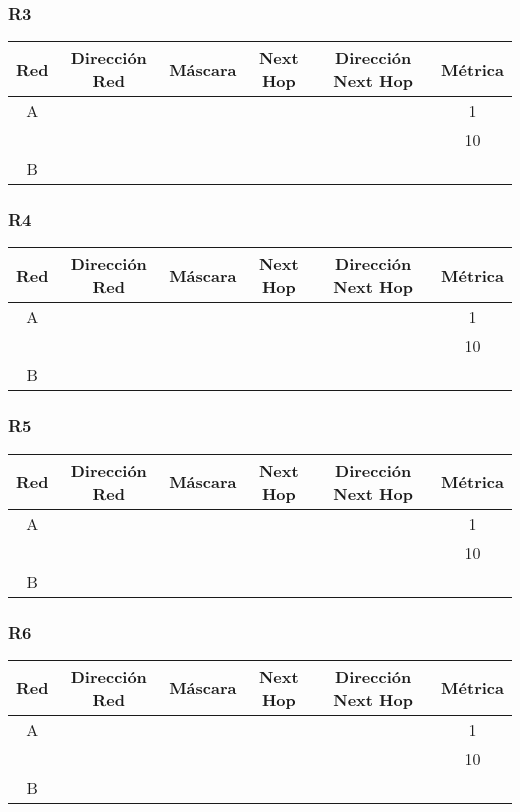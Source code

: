 \documentclass[12pt, a4paper, spanish]{article}
\begin{document}
\subsubsection{R3}
\begin{center}
\begin{tabular}{|c|c|c|c|c|c|}
	\hline
	Red & Dirección Red & Máscara & Next Hop & Dirección Next Hop & Métrica \\
	\hline
	\hline
	A &  &  &  &  & 1\\
 	  &  &  &  &  & 10 \\
	\hline	
	B & & & & &\\
	\hline
\end{tabular}
\end{center}

\subsubsection{R4}
\begin{center}
\begin{tabular}{|c|c|c|c|c|c|}
	\hline
	Red & Dirección Red & Máscara & Next Hop & Dirección Next Hop & Métrica \\
	\hline
	\hline
	A &  &  &  &  & 1\\
 	  &  &  &  &  & 10 \\
	\hline	
	B & & & & &\\
	\hline
\end{tabular}
\end{center}

\subsubsection{R5}
\begin{center}
\begin{tabular}{|c|c|c|c|c|c|}
	\hline
	Red & Dirección Red & Máscara & Next Hop & Dirección Next Hop & Métrica \\
	\hline
	\hline
	A &  &  &  &  & 1\\
 	  &  &  &  &  & 10 \\
	\hline	
	B & & & & &\\
	\hline
\end{tabular}
\end{center}

\subsubsection{R6}
\begin{center}
\begin{tabular}{|c|c|c|c|c|c|}
	\hline
	Red & Dirección Red & Máscara & Next Hop & Dirección Next Hop & Métrica \\
	\hline
	\hline
	A &  &  &  &  & 1\\
 	  &  &  &  &  & 10 \\
	\hline	
	B & & & & &\\
	\hline
\end{tabular}
\end{center}
\end{document}
